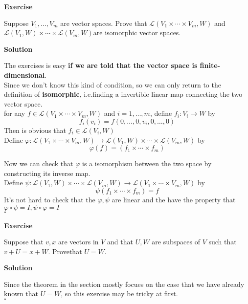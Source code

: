 \documentclass{article}
\newenvironment{exercise}{%
{\textbf{Exercise\\}
    }
}{
}
\newenvironment{solution}{%
{
    \textbf{Solution\\}
    }
}{
  \hfill $\square$ 
  \par\bigskip 
}
\begin{document}
\begin{CJK}{UTF8}{gkai}
\begin{exercise}
    Suppose $V_1,\ldots,V_m$ are vector spaces. Prove that $\mathcal{L}(V_1 \times  \cdots \times  V_m,W)$ and$\mathcal{L}(V_1,W)\times \cdots\times \mathcal{L}(V_m,W)$are isomorphic vector spaces.\\
\end{exercise}

\begin{solution}
    The exercises is easy \textbf{if we are told that the vector space is finite-dimensional}. \\

    Since we don't know this kind of condition, so we can only return to the definition of \textbf{isomorphic}, i.e.finding a invertible linear map connecting the two vector space.\\

    for any $f \in \mathcal{L}(V_1 \times  \cdots \times  V_m,W)$ and $i = 1,\ldots, m$, define $f_i : V_i \to W$ by
    \[f_i(v_i) = f(0,\ldots,0,v_i,0,\ldots,0)\]
    Then is obvious that $f_i \in \mathcal{L}(V_i,W)$\\

    Define $\varphi:\mathcal{L}(V_1 \times  \cdots \times  V_m,W) \to \mathcal{L}(V_1,W)\times \cdots\times \mathcal{L}(V_m,W)$ by
    \[\varphi(f) = (f_1\times \cdots\times f_m)\]

    Now we can check that $\varphi$ is a isomorphism between the two space by constructing its inverse map.\\

    Define $\psi : \mathcal{L}(V_1,W)\times \cdots\times \mathcal{L}(V_m,W) \to \mathcal{L}(V_1 \times  \cdots \times  V_m,W)$ by
    \[\psi(f_1\times \cdots\times f_m) = f\]
    It's not hard to check that the $\varphi,\psi$ are linear and the have the property that $\varphi \circ \psi = I , \psi \circ \varphi = I$\\
\end{solution}

\begin{exercise}
    Suppose that $v,x$ are vectors in $V$ and that $U,W$ are subspaces of $V$ such that $v + U = x + W$. Provethat $U = W$.\\
\end{exercise}

\begin{solution}
    Since the theorem in the section mostly focues on the case that we have already known that $U = W$, so this exercise may be tricky at first.\\


\end{solution}
\end{CJK}
\end{document}
